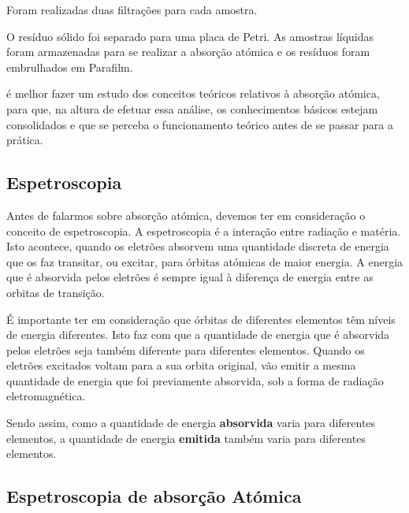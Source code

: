 Foram realizadas duas filtrações para cada amostra.

O resíduo sólido foi separado para uma placa de Petri.
As amostras líquidas foram armazenadas para se realizar a absorção atómica e os resíduos foram embrulhados em Parafilm.

\hrulefill

 é melhor fazer um estudo dos conceitos teóricos relativos à absorção atómica, para que, na altura de efetuar essa análise, os conhecimentos básicos estejam consolidados e que se perceba o funcionamento teórico antes de se passar para a prática.

\subsection*{Espetroscopia}\label{subsec:espetroscopia}

Antes de falarmos sobre absorção atómica, devemos ter em consideração o conceito de espetroscopia.
A espetroscopia é a interação entre radiação e matéria.
Isto acontece, quando os eletrões absorvem uma quantidade discreta de energia que os faz transitar, ou excitar, para órbitas atómicas de maior energia.
A energia que é absorvida pelos eletrões é sempre igual à diferença de energia entre as orbitas de transição.

É importante ter em consideração que órbitas de diferentes elementos têm níveis de energia diferentes.
Isto faz com que a quantidade de energia que é absorvida pelos eletrões seja também diferente para diferentes elementos.
Quando os eletrões excitados voltam para a sua orbita original, vão emitir a mesma quantidade de energia que foi previamente absorvida, sob a forma de radiação eletromagnética.

Sendo assim, como a quantidade de energia \textbf{absorvida} varia para diferentes elementos, a quantidade de energia \textbf{emitida} também varia para diferentes elementos.

\subsection*{Espetroscopia de absorção Atómica}\label{subsec:absorcao-atomica}

